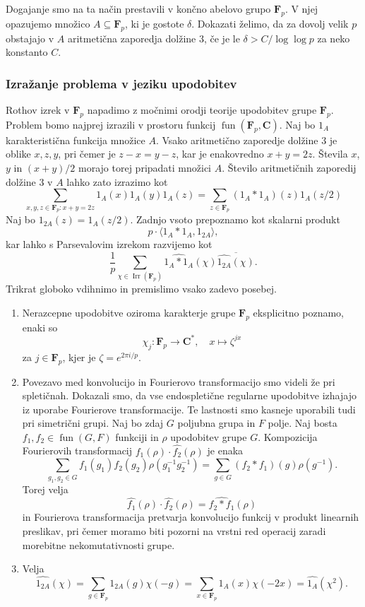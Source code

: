 \documentclass[11pt]{book}
\def\CC{\mathbf{C}}
\def\FF{\mathbf{F}}
\DeclareMathOperator\Irr{Irr}
\DeclareMathOperator\fun{fun}
\theoremstyle{definition}
\theoremstyle{zgled}
\theoremstyle{zgledbrezstevilke}
\theoremstyle{odprtproblem}
\theoremstyle{domacanaloga}
\theoremstyle{izrek}
\begin{document}
Dogajanje smo na ta način prestavili v končno abelovo grupo $\FF_p$. V njej opazujemo množico $A \subseteq \FF_p$, ki je gostote $\delta$. Dokazati želimo, da za dovolj velik $p$ obstajajo v $A$ aritmetična zaporedja dolžine $3$, če je le $\delta > C/\log \log p$ za neko konstanto $C$. 

\subsubsection{Izražanje problema v jeziku upodobitev}

Rothov izrek v $\FF_p$ napadimo z močnimi orodji teorije upodobitev grupe $\FF_p$. Problem bomo najprej izrazili v prostoru funkcij $\fun(\FF_p, \CC)$. Naj bo $1_A$ karakteristična funkcija množice $A$. Vsako aritmetično zaporedje dolžine $3$ je oblike $x,z,y$, pri čemer je $z-x = y-z$, kar je enakovredno $x+y=2z$. Števila $x$, $y$ in $(x+y)/2$ morajo torej pripadati množici $A$. Število aritmetičnih zaporedij dolžine $3$ v $A$ lahko zato izrazimo kot
\[
    \sum_{x,y,z \in \FF_p : x+y=2z} 1_A(x) 1_A(y) 1_A(z)
    = \sum_{z \in \FF_p} \left( 1_A * 1_A \right)(z) 1_A(z/2)
\]
Naj bo $1_{2A}(z) = 1_A(z/2)$. Zadnjo vsoto prepoznamo kot skalarni produkt
\[
    p \cdot \langle 1_A * 1_A, 1_{2A} \rangle,
\]
kar lahko s Parsevalovim izrekom razvijemo kot
\[
    \frac{1}{p} \sum_{\chi \in \Irr(\FF_p)} \widehat{1_A*1_A}(\chi) \overline{\widehat{1_{2A}}(\chi)}.
\]
Trikrat globoko vdihnimo in premislimo vsako zadevo posebej. 

\begin{enumerate}
\item Nerazcepne upodobitve oziroma karakterje grupe $\FF_p$ eksplicitno poznamo, enaki so
\[
    \chi_j \colon \FF_p \to \CC^*, \quad
    x \mapsto \zeta^{j x}
\]
za $j \in \FF_p$, kjer je $\zeta = e^{2 \pi i/p}$. 

\item Povezavo med konvolucijo in Fourierovo transformacijo smo videli že pri spletičnah. Dokazali smo, da vse endospletične regularne upodobitve izhajajo iz uporabe Fourierove transformacije. Te lastnosti smo kasneje uporabili tudi pri simetrični grupi. Naj bo zdaj $G$ poljubna grupa in $F$ polje. Naj bosta $f_1, f_2 \in \fun(G,F)$ funkciji in $\rho$ upodobitev grupe $G$. Kompozicija Fourierovih transformacij $\widehat{f_1}(\rho) \cdot \widehat{f_2}(\rho)$ je enaka
\[
    \sum_{g_1, g_2 \in G} f_1(g_1) f_2(g_2) \rho(g_1^{-1} g_2^{-1}) =
    \sum_{g \in G} (f_2 * f_1)(g) \rho(g^{-1}).
\]
Torej velja
\[
    \widehat{f_1}(\rho) \cdot \widehat{f_2}(\rho) =
    \widehat{f_2 * f_1}(\rho)
\]
in Fourierova transformacija pretvarja konvolucijo funkcij v produkt linearnih preslikav, pri čemer moramo biti pozorni na vrstni red operacij zaradi morebitne nekomutativnosti grupe.

\item Velja
\[
    \widehat{1_{2A}}(\chi) = \sum_{g \in \FF_p} 1_{2A}(g) \chi(-g)
    = \sum_{x \in \FF_p} 1_A(x) \chi(-2x)
    = \widehat{1_A}(\chi^2).
\]
\end{enumerate}
\end{document}
